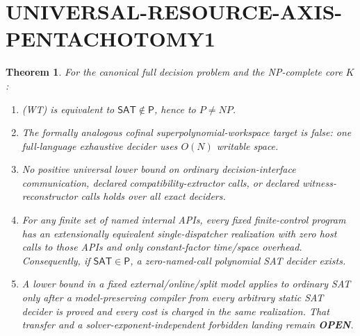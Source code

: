 \documentclass[11pt]{article}
\newtheorem{theorem}{Theorem}
\newcommand{\SAT}{\mathsf{SAT}}
\newcommand{\OPEN}{\textbf{OPEN}}
\begin{document}
\section{UNIVERSAL-RESOURCE-AXIS-PENTACHOTOMY1}
\begin{theorem}
For the canonical full decision problem and the NP-complete core $K$:
\begin{enumerate}[label=(\roman*),leftmargin=1.7em]
\item (WT) is equivalent to $\SAT\notin\mathsf P$, hence to $P\ne NP$.
\item The formally analogous cofinal superpolynomial-workspace target is
false: one full-language exhaustive decider uses $O(N)$ writable space.
\item No positive universal lower bound on ordinary decision-interface
communication, declared compatibility-extractor calls, or declared witness-
reconstructor calls holds over all exact deciders.
\item For any finite set of named internal APIs, every fixed finite-control
program has an extensionally equivalent single-dispatcher realization with
zero host calls to those APIs and only constant-factor time/space overhead.
Consequently, if $\SAT\in\mathsf P$, a zero-named-call polynomial SAT decider
exists.
\item A lower bound in a fixed external/online/split model applies to ordinary
SAT only after a model-preserving compiler from every arbitrary static SAT
decider is proved and every cost is charged in the same realization.  That
transfer and a solver-exponent-independent forbidden landing remain \OPEN.
\end{enumerate}
\end{theorem}
\end{document}
